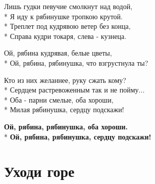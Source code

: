 \medskip

\begin{minipage}{\linewidth}
Лишь гудки певучие смолкнут над водой,\\*
Я иду к рябинушке тропкою крутой.\\*
Треплет под кудрявою ветер без конца,\\*
Справа кудри токаря, слева - кузнеца.\\
\end{minipage}\par\medskip\nobreak

\medskip

\begin{minipage}{\linewidth}
\hspace*{1.5em}Ой, рябина кудрявая, белые цветы,\\*
\hspace*{1.5em}Ой, рябина, рябинушка, что взгрустнула ты?\\
\end{minipage}\par\medskip\nobreak

\medskip

\begin{minipage}{\linewidth}
Кто из них желаннее, руку сжать кому?\\*
Сердцем растревоженным так и не пойму...\\*
Оба - парни смелые, оба хороши,\\*
Милая рябинушка, сердцу подскажи!\\
\end{minipage}\par\medskip\nobreak

\medskip

\begin{minipage}{\linewidth}
\hspace*{1.5em}\textbf{Ой, рябина, рябинушка, оба хороши.}\\*
\hspace*{1.5em}\textbf{Ой, рябина, рябинушка, сердцу подскажи!}\\
\end{minipage}

\vspace{\fill}\newpage

\section{Уходи горе}
\label{song:Уходи_горе}

